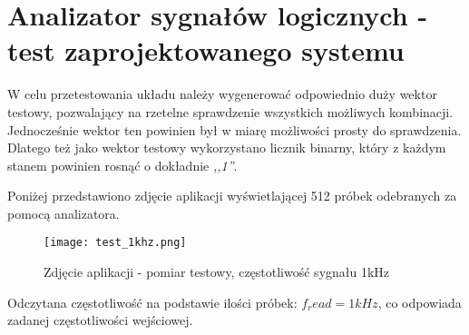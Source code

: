 \section{Analizator sygnałów logicznych - test zaprojektowanego systemu}
    W celu przetestowania układu należy wygenerować odpowiednio duży wektor testowy,
    pozwalający na rzetelne sprawdzenie wszystkich możliwych kombinacji.
    Jednocześnie wektor ten powinien był w miarę możliwości prosty do sprawdzenia.
    Dlatego też jako wektor testowy wykorzystano licznik binarny, który z każdym stanem powinien rosnąć o dokładnie \textit{,,1''}.

    Poniżej przedstawiono zdjęcie aplikacji wyświetlającej 512 próbek odebranych za pomocą analizatora.
    \begin{figure}[!ht]
        \centering
        \texttt{[image: test\_1khz.png]}
        \caption{Zdjęcie aplikacji - pomiar testowy, częstotliwość sygnału 1kHz}
    \end{figure}

    Odczytana częstotliwość na podstawie ilości próbek: $f_read = 1kHz$, co odpowiada zadanej częstotliwości wejściowej.